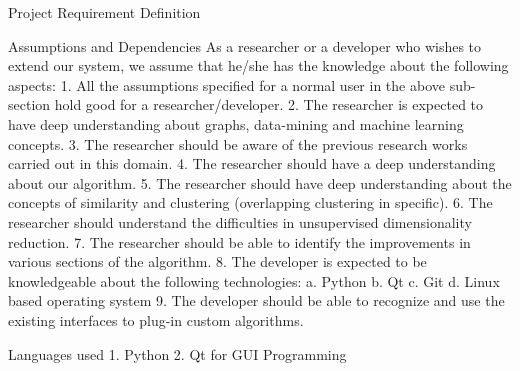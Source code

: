 \documentclass{report}
\begin{document}
\begin{projChapter}{Project Requirement Definition}
\begin{projSection}{Assumptions and Dependencies}
As a researcher or a developer who wishes to extend our system, we assume that he/she has the knowledge about the following aspects:
1. All the assumptions specified for a normal user in the above sub-section hold good for a researcher/developer.
2. The researcher is expected to have deep understanding about graphs, data-mining and machine learning concepts.
3. The researcher should be aware of the previous research works carried out in this domain.
4. The researcher should have a deep understanding about our algorithm.
5. The researcher should have deep understanding about the concepts of similarity and clustering (overlapping clustering in specific).
6. The researcher should understand the difficulties in unsupervised dimensionality reduction.
7. The researcher should be able to identify the improvements in various sections of the algorithm.
8. The developer is expected to be knowledgeable about the following technologies:
a. Python
b. Qt
c. Git
d. Linux based operating system
9. The developer should be able to recognize and use the existing interfaces to plug-in custom algorithms.
 \end{projSection}
 
 \begin{projSection}{Languages used}
  1. Python
  2. Qt for GUI Programming  
 \end{projSection}

\end{projChapter}



\iffalse
\begin{homeworkProblem}
\lipsum[1]\vspace{10pt} %

\end{homeworkProblem}
\end{document}
